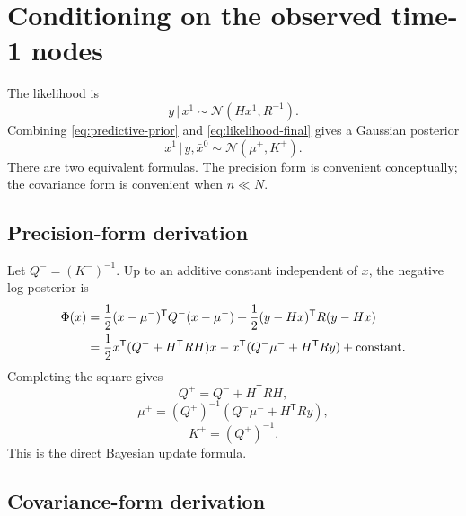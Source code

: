 \documentclass[11pt]{article}
\numberwithin{equation}{section}
\newcommand{\transpose}{^{\mathsf T}}
\newcommand{\given}{\,|\,}
\newcommand{\half}{\frac{1}{2}}
\begin{document}
\section{Conditioning on the observed time-1 nodes}
\label{sec:conditioning}

The likelihood is
\begin{equation}
  y\given x^1\sim\mathcal N(Hx^1,R^{-1}).
  \label{eq:likelihood-final}
\end{equation}
Combining \eqref{eq:predictive-prior} and \eqref{eq:likelihood-final} gives a Gaussian posterior
\begin{equation}
  x^1\given y,\bar x^0\sim\mathcal N(\mu^+,K^+).
  \label{eq:posterior-distribution}
\end{equation}
There are two equivalent formulas.  The precision form is convenient conceptually; the covariance form is convenient when $n\ll N$.

\subsection{Precision-form derivation}

Let $Q^-=(K^-)^{-1}$.  Up to an additive constant independent of $x$, the negative log posterior is
\begin{align}
  \Phi(x)
  &=\half(x-\mu^-)\transpose Q^-(x-\mu^-)
    +\half(y-Hx)\transpose R(y-Hx)\notag\\
  &=\half x\transpose(Q^-+H\transpose R H)x
    -x\transpose(Q^-\mu^-+H\transpose R y)
    +\text{constant}.
  \label{eq:posterior-quadratic-expanded}
\end{align}
Completing the square gives
\begin{equation}
  \boxed{Q^+=Q^-+H\transpose RH,}
  \label{eq:Qplus}
\end{equation}
\begin{equation}
  \boxed{\mu^+=(Q^+)^{-1}\left(Q^-\mu^-+H\transpose R y\right),}
  \label{eq:muplus-precision}
\end{equation}
\begin{equation}
  \boxed{K^+=(Q^+)^{-1}.}
  \label{eq:Kplus-precision}
\end{equation}
This is the direct Bayesian update formula.

\subsection{Covariance-form derivation}
\end{document}

